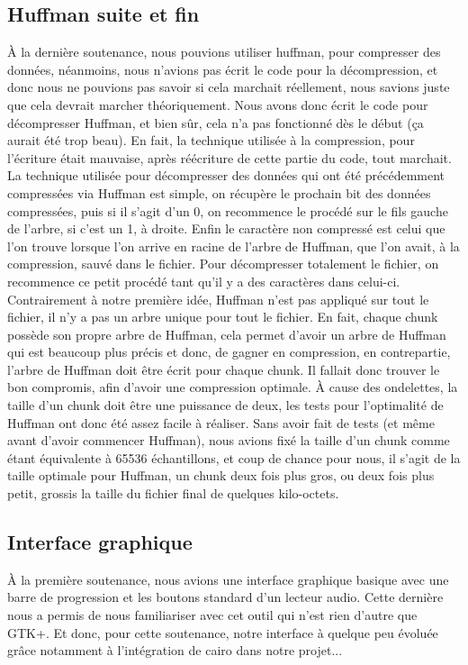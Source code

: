 \documentclass[a4paper,12pt]{article}
\begin{document}
	\subsection{Huffman suite et fin}
À la dernière soutenance, nous pouvions utiliser huffman, pour compresser des
données, néanmoins, nous n'avions pas écrit le code pour la décompression, et
donc nous ne pouvions pas savoir si cela marchait réellement, nous savions juste
que cela devrait marcher théoriquement. Nous avons donc écrit le code pour
décompresser Huffman, et bien sûr, cela n'a pas fonctionné dès le début (ça
aurait été trop beau). En fait, la technique utilisée à la compression, pour
l'écriture était mauvaise, après réécriture de cette partie du code, tout
marchait.\\
La technique utilisée pour décompresser des données qui ont été précédemment
compressées via Huffman est simple, on récupère le prochain bit des données
compressées, puis si il s'agit d'un 0, on recommence le procédé sur le fils
gauche de l'arbre, si c'est un 1, à droite. Enfin le caractère non compressé est
celui que l'on trouve lorsque l'on arrive en racine de l'arbre de Huffman, que
l'on avait, à la compression, sauvé dans le fichier. Pour décompresser
totalement le fichier, on recommence ce petit
procédé tant qu'il y a des caractères dans celui-ci.\\
Contrairement à notre première idée, Huffman n'est pas appliqué sur tout le
fichier, il n'y a pas un arbre unique pour tout le fichier. En fait, chaque
chunk possède son propre arbre de Huffman, cela permet d'avoir un arbre de
Huffman qui est beaucoup plus précis et donc, de gagner en compression, en
contrepartie, l'arbre de
Huffman doit être écrit pour chaque chunk. Il fallait donc trouver le bon
compromis, afin d'avoir une compression optimale. À cause des ondelettes, la
taille d'un chunk doit être une puissance de deux, les tests pour l'optimalité
de Huffman ont donc été assez facile à réaliser. Sans avoir fait de tests (et
même avant d'avoir commencer Huffman), nous avions fixé la taille d'un chunk
comme étant équivalente à 65536 échantillons, et coup de chance pour nous, il
s'agit de la taille optimale pour Huffman, un chunk deux fois plus gros, ou deux
fois plus petit, grossis la taille du fichier final de quelques
kilo-octets.\\
	\subsection{Interface graphique}
À la première soutenance, nous avions une interface graphique basique avec une 
barre de progression et les boutons standard d'un lecteur audio. Cette dernière 
nous a permis de nous familiariser avec cet outil qui n'est rien d'autre que 
GTK+. Et donc, pour cette soutenance, notre interface à quelque peu évoluée grâce 
notamment à l'intégration de cairo dans notre projet...
\end{document}
